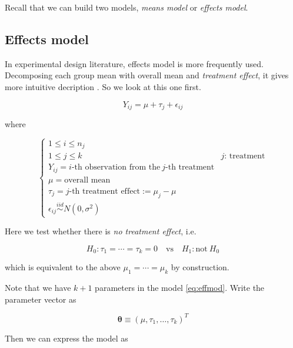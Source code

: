 \documentclass[]{book}
\theoremstyle{definition}
\theoremstyle{definition}
\theoremstyle{definition}
\theoremstyle{remark}
\begin{document}
Recall that we can build two models, \emph{means model} or \emph{effects model}.

\hypertarget{effects-model}{%
\subsection{Effects model}\label{effects-model}}

In experimental design literature, effects model is more frequently used. Decomposing each group mean with overall mean and \emph{treatment effect}, it gives more intuitive decription \citep{Montgomery:2012aa}. So we look at this one first.

\begin{equation}
  Y_{ij} = \mu + \tau_j + \epsilon_{ij}
  \label{eq:effmod}
\end{equation}

where

\[
\begin{cases}
  1 \le i \le n_j \\
  1 \le j \le k & j \text{: treatment} \\
  Y_{ij} = i \text{-th observation from the}\: j \text{-th treatment} \\
  \mu = \text{overall mean} \\
  \tau_j = j \text{-th treatment effect} := \mu_j - \mu \\
  \epsilon_{ij} \stackrel{iid}{\sim}N(0, \sigma^2)
\end{cases}
\]

Here we test whether there is \emph{no treatment effect}, i.e.

\[H_0: \tau_1 = \cdots = \tau_k = 0 \quad \text{vs} \quad H_1: \text{not}\: H_0\]

which is equivalent to the above \(\mu_1 = \cdots = \mu_k\) by construction.

Note that we have \(k + 1\) parameters in the model \eqref{eq:effmod}. Write the parameter vector as

\[\boldsymbol\theta \equiv (\mu, \tau_1, \ldots, \tau_k)^T\]

Then we can express the model as
\end{document}
